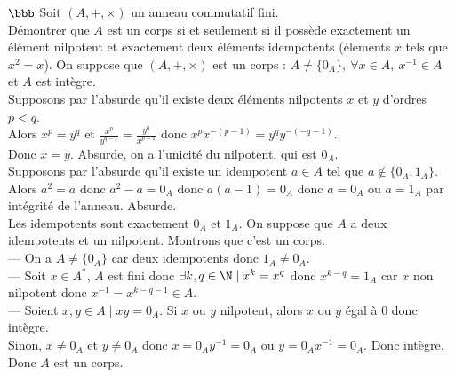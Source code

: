 \documentclass[11pt]{article}
\begin{document}
\begin{exercice}{$\bbb$}{}
    Soit $(A,+,\times)$ un anneau commutatif fini.\\
    Démontrer que $A$ est un corps si et seulement si il possède exactement un élément nilpotent et exactement deux éléments idempotents (élements $x$ tels que $x^2=x$).
    \tcblower
    \boxed{\ra} On suppose que $(A,+,\times)$ est un corps : $A\neq\{0_A\}, ~ \forall x \in A, ~ x^{-1}\in A$ et $A$ est intègre.\\
    Supposons par l'absurde qu'il existe deux éléments nilpotents $x$ et $y$ d'ordres $p<q$.\\
    Alors $x^p=y^q$ et $\frac{x^p}{y^{q-1}}=\frac{y^q}{x^{p-1}}$ donc $x^px^{-(p-1)}=y^qy^{-(-q-1)}$.\\
    Donc $x=y$. Absurde, on a l'unicité du nilpotent, qui est $0_A$.\\
    Supposons par l'absurde qu'il existe un idempotent $a\in A$ tel que $a\notin\{0_A,1_A\}$.\\
    Alors $a^2=a$ donc $a^2-a=0_A$ donc $a(a-1)=0_A$ donc $a=0_A$ ou $a=1_A$ par intégrité de l'anneau. Absurde.\\
    Les idempotents sont exactement $0_A$ et $1_A$.\n
    \boxed{\la} On suppose que $A$ a deux idempotents et un nilpotent. Montrons que c'est un corps.\\
    --- On a $A\neq\{0_A\}$ car deux idempotents donc $1_A\neq0_A$.\\ 
    --- Soit $x\in A^*$, $A$ est fini donc $\exists k,q \in \N \mid x^k=x^q$ donc $x^{k-q}=1_A$ car $x$ non nilpotent donc $x^{-1}=x^{k-q-1}\in A$.\\
    --- Soient $x,y\in A \mid xy=0_A$. Si $x$ ou $y$ nilpotent, alors $x$ ou $y$ égal à 0 donc intègre.\\
    Sinon, $x\neq0_A$ et $y\neq0_A$ donc $x=0_Ay^{-1}=0_A$ ou $y=0_Ax^{-1}=0_A$. Donc intègre.\\
    Donc $A$ est un corps. 
\end{exercice}
\end{document}

